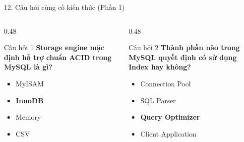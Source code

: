 \documentclass[aspectratio=169,11pt]{beamer}
\begin{document}
\begin{frame}{12. Câu hỏi củng cố kiến thức (Phần 1)}
\begin{columns}[t]
  \begin{column}{0.48\textwidth}
    \begin{exampleblock}{Câu hỏi 1}
      \textbf{Storage engine mặc định hỗ trợ chuẩn ACID trong MySQL là gì?}
      \begin{itemize}\small
        \item[A.] MyISAM
        \item[B.] \textbf{InnoDB} \quad \checkmark
        \item[C.] Memory
        \item[D.] CSV
      \end{itemize}
    \end{exampleblock}
  \end{column}
  \begin{column}{0.48\textwidth}
    \begin{exampleblock}{Câu hỏi 2}
      \textbf{Thành phần nào trong MySQL quyết định có sử dụng Index hay không?}
      \begin{itemize}\small
        \item[A.] Connection Pool
        \item[B.] SQL Parser
        \item[C.] \textbf{Query Optimizer} \quad \checkmark
        \item[D.] Client Application
      \end{itemize}
    \end{exampleblock}
  \end{column}
\end{columns}
\end{frame}
\end{document}
